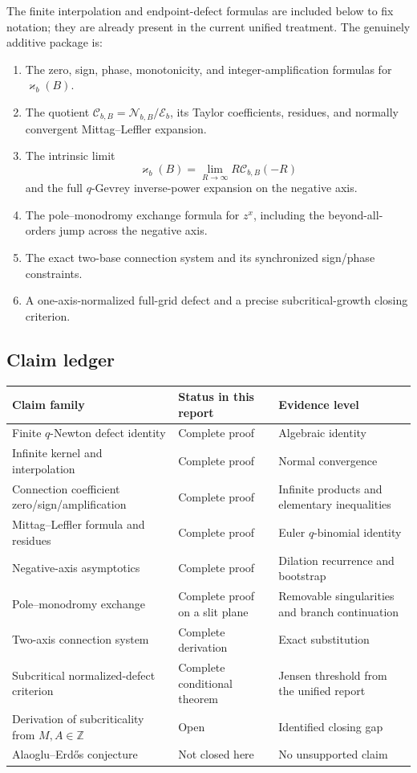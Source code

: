 \documentclass[11pt]{article}
\theoremstyle{definition}
\newcommand{\Nker}{\mathscr{N}}
\newcommand{\Eker}{\mathscr{E}}
\newcommand{\Cker}{\mathscr{C}}
\newcommand{\kk}{\varkappa}
\newcommand{\Z}{\mathbb{Z}}
\begin{document}
The finite interpolation and endpoint-defect formulas are included below to fix notation;
they are already present in the current unified treatment.  The genuinely additive package is:
\begin{enumerate}
  \item The zero, sign, phase, monotonicity, and integer-amplification formulas for $\kk_b(B)$.
  \item The quotient $\Cker_{b,B}=\Nker_{b,B}/\Eker_b$, its Taylor coefficients, residues, and normally convergent Mittag--Leffler expansion.
  \item The intrinsic limit
  \[
  \kk_b(B)=\lim_{R\to\infty} R\Cker_{b,B}(-R)
  \]
  and the full $q$-Gevrey inverse-power expansion on the negative axis.
  \item The pole--monodromy exchange formula for $z^x$, including the beyond-all-orders jump across the negative axis.
  \item The exact two-base connection system and its synchronized sign/phase constraints.
  \item A one-axis-normalized full-grid defect and a precise subcritical-growth closing criterion.
\end{enumerate}

\subsection{Claim ledger}

\begin{center}
\begin{tabularx}{\textwidth}{@{}>{\raggedright\arraybackslash}p{}X>{\raggedright\arraybackslash}p{}@{}}
\toprule
Claim family & Status in this report & Evidence level \\
\midrule
Finite $q$-Newton defect identity & Complete proof & Algebraic identity \\
Infinite kernel and interpolation & Complete proof & Normal convergence \\
Connection coefficient zero/sign/amplification & Complete proof & Infinite products and elementary inequalities \\
Mittag--Leffler formula and residues & Complete proof & Euler $q$-binomial identity \\
Negative-axis asymptotics & Complete proof & Dilation recurrence and bootstrap \\
Pole--monodromy exchange & Complete proof on a slit plane & Removable singularities and branch continuation \\
Two-axis connection system & Complete derivation & Exact substitution \\
Subcritical normalized-defect criterion & Complete conditional theorem & Jensen threshold from the unified report \\
Derivation of subcriticality from $M,A\in\Z$ & Open & Identified closing gap \\
Alaoglu--Erd\H{o}s conjecture & Not closed here & No unsupported claim \\
\bottomrule
\end{tabularx}
\end{center}
\end{document}
